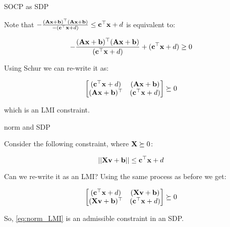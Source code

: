 \documentclass{beamer}
\begin{document}
\begin{frame}{SOCP as SDP}
	\begin{flushleft}
		
		Note that $-\frac{(\mathbf{A}\mathbf{x} + \mathbf{b})^\top (\mathbf{A}\mathbf{x} + \mathbf{b})}{-(\mathbf{c}^\top \mathbf{x} + d)} \leq \mathbf{c}^\top \mathbf{x} + d$ is equivalent to:
		
		\begin{equation}
			-\frac{(\mathbf{A}\mathbf{x} + \mathbf{b})^\top (\mathbf{A}\mathbf{x} + \mathbf{b})}{(\mathbf{c}^\top \mathbf{x} + d)} + (\mathbf{c}^\top \mathbf{x} + d) \geq 0
		\end{equation}
		
		Using Schur we can re-write it as:
		
		\begin{equation}
			\begin{bmatrix}
				(\mathbf{c}^\top \mathbf{x} + d) & (\mathbf{A}\mathbf{x} + \mathbf{b}) \\
				(\mathbf{A}\mathbf{x} + \mathbf{b})^\top & (\mathbf{c}^\top \mathbf{x} + d)
			\end{bmatrix} \succeq 0
		\end{equation}
		
		which is an LMI constraint.
		
	\end{flushleft}
\end{frame}



\begin{frame}{norm and SDP}
	\begin{flushleft}
		
		Consider the following constraint, where $\mathbf{X} \succeq 0$:
		
		\begin{equation}
			\label{eq:norm_LMI}
			||\mathbf{X}\mathbf{v} + \mathbf{b}|| \leq \mathbf{c}^\top \mathbf{x} + d
		\end{equation}
		
		Can we re-write it as an LMI? Using the same process as before we get:
		
		\begin{align}
			\begin{bmatrix}
	(\mathbf{c}^\top \mathbf{x} + d) & (\mathbf{X}\mathbf{v} + \mathbf{b}) \\
	(\mathbf{X}\mathbf{v} + \mathbf{b})^\top & (\mathbf{c}^\top \mathbf{x} + d)
		\end{bmatrix} \succeq 0
		\end{align}
	
		So, \eqref{eq:norm_LMI} is an admissible constraint in an SDP.
		
	\end{flushleft}
\end{frame}
\end{document}
